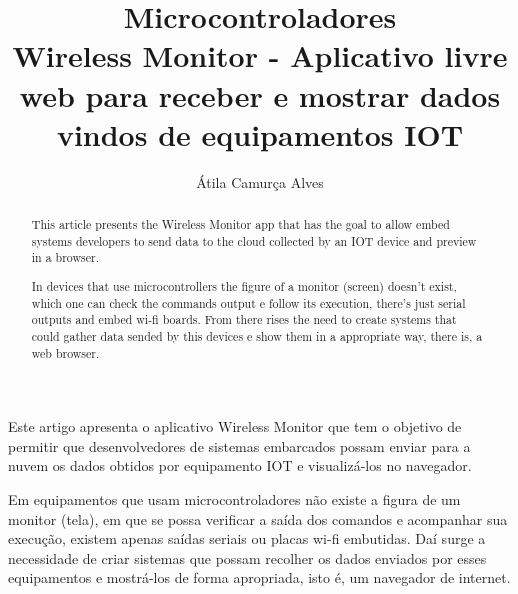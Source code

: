 \documentclass[a4paper,12pt]{article}
\title{Microcontroladores\\Wireless Monitor - Aplicativo livre web para receber e mostrar dados vindos de equipamentos IOT}
\author{Átila Camurça Alves\inst{1}}
\newcommand{\wm}{Wireless Monitor\xspace}
\begin{document}
\maketitle

\begin{abstract}
This article presents the \wm app that has the goal to allow
embed systems developers to send data to the cloud collected by
an IOT device and preview in a browser.

In devices that use microcontrollers the figure of a monitor (screen)
doesn't exist, which one can check the commands output e follow
its execution, there's just serial outputs and embed wi-fi boards.
From there rises the need to create systems that could gather data
sended by this devices e show them in a appropriate way, there is,
a web browser.
\end{abstract}
     
\begin{resumo}
Este artigo apresenta o aplicativo \wm que tem o objetivo de permitir que
desenvolvedores de sistemas embarcados possam enviar para a nuvem
os dados obtidos por equipamento IOT e visualizá-los no navegador.

Em equipamentos que usam microcontroladores não existe a figura de
um monitor (tela), em que se possa verificar a saída dos comandos e acompanhar
sua execução, existem apenas saídas seriais ou placas wi-fi embutidas.
Daí surge a necessidade de criar sistemas que possam recolher os dados
enviados por esses equipamentos e mostrá-los de forma apropriada, isto é,
um navegador de internet.
\end{resumo}





\end{document}
